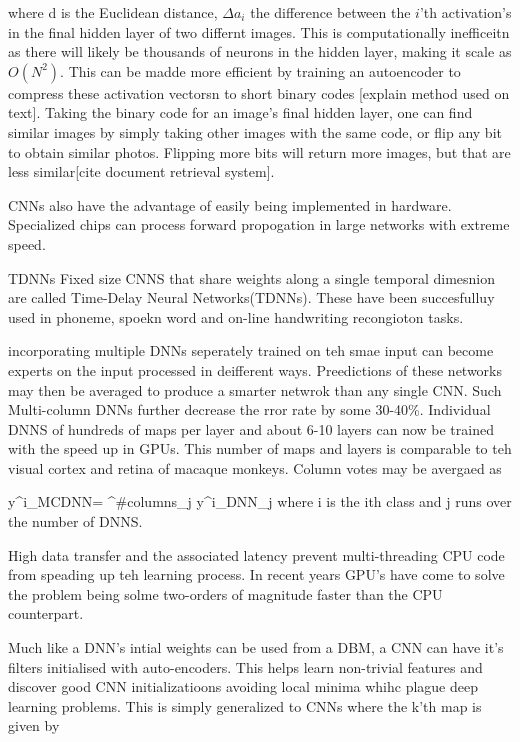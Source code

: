 where d is the Euclidean distance, $\Delta a_i$ the difference between the $i$'th activation's in the final hidden layer of two differnt images.
This is computationally inefficeitn as there will likely be thousands of neurons in the hidden layer, making it scale as $O(N^2)$.
This can be madde more efficient by training an autoencoder to compress these activation vectorsn to short binary codes [explain method used on text]\citep{krizhevsky2012imagenet}.
Taking the binary code for an image's final hidden layer, one can find similar images by simply taking other images with the same code, or flip any bit to obtain similar photos.
Flipping more bits will return more images, but that are less similar[cite document retrieval system]. 

CNNs also have the advantage of easily being implemented in hardware. 
Specialized chips can process forward propogation in large networks with extreme speed\citep{lecun1995convolutional}.

TDNNs
Fixed size CNNS that share weights along a single temporal dimesnion are called Time-Delay Neural Networks(TDNNs).
These have been succesfulluy used in phoneme, spoekn word and on-line handwriting recongioton tasks\citep{lecun1995convolutional}.


incorporating multiple DNNs seperately trained on teh smae input can become experts on the input processed in deifferent ways\citep{ciresan2012multi}.
Preedictions of these networks may then be averaged to produce a smarter netwrok than any single CNN\citep{ciresan2012multi}.
Such Multi-column DNNs further decrease the rror rate by some 30-40\%\citep{ciresan2012multi}.
Individual DNNS of hundreds of maps per layer and about 6-10 layers can now be trained with the speed up in GPUs.
This number of maps and layers is comparable to teh visual cortex and retina of macaque monkeys\citep{ciresan2012multi}.
Column votes may be avergaed as

\be
y^i_{MCDNN}= \sum^{\#columns}_{j} y^i_{DNN_j}
\ee
where i is the ith class and j runs over the number of DNNS.

High data transfer and the associated latency prevent multi-threading CPU code from speading up teh learning process\citep{ciresan2012multi}.
In recent years GPU's have come to solve the problem being solme two-orders of magnitude faster than the CPU counterpart\citep{ciresan2012multi}.

Much like a DNN's intial weights can be used from a DBM, a CNN can have it's filters initialised with auto-encoders.
This helps learn non-trivial features and discover good CNN initializatioons avoiding local minima whihc plague deep learning problems\citep{masci2011stacked}.
This is simply generalized to CNNs where the k'th map is given by

